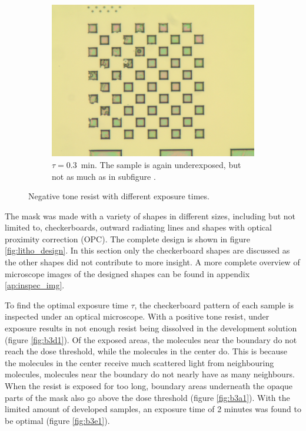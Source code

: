 \begin{figure}[!b]
    \hfill
    \begin{subfigure}[t]{0.3\linewidth}
        \centering
        \includegraphics[width=\textwidth]{data/b2i1.jpg}
	    \caption{$\tau = 0.3$~min. The sample is again underexposed, but not as much as in subfigure .}
	    \label{fig:b2i1}
    \end{subfigure}
    \caption{Negative tone resist with different exposure times.}
    \label{fig:optical-neg}
\end{figure}

The mask was made with a variety of shapes in different sizes, including but not limited to, checkerboards, outward radiating lines and shapes with optical proximity correction (OPC). The complete design is shown in figure \ref{fig:litho_design}. In this section only the checkerboard shapes are discussed as the other shapes did not contribute to more insight. A more complete overview of microscope images of the designed shapes can be found in appendix \ref{ap:inspec_img}.

To find the optimal exposure time $\tau$, the checkerboard pattern of each sample is inspected under an optical microscope. With a positive tone resist, under exposure results in not enough resist being dissolved in the development solution (figure \ref{fig:b3d1}). Of the exposed areas, the molecules near the boundary do not reach the dose threshold, while the molecules in the center do. This is because the molecules in the center receive much scattered light from neighbouring molecules, molecules near the boundary do not nearly have as many neighbours. When the resist is exposed for too long, boundary areas underneath the opaque parts of the mask also go above the dose threshold (figure \ref{fig:b3a1}). With the limited amount of developed samples, an exposure time of 2 minutes was found to be optimal (figure \ref{fig:b3e1}). 

